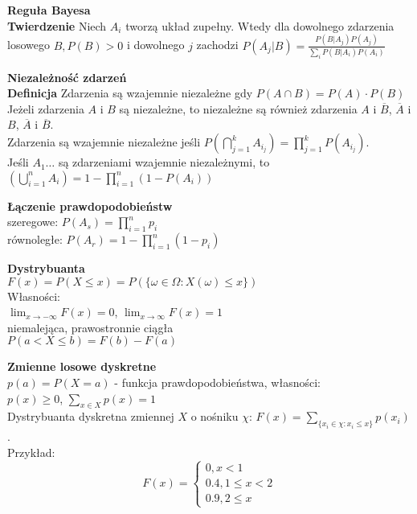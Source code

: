 \documentclass[10pt,landscape,a4paper,notitlepage]{article}
\begin{document}
\begin{multicols*}{4}
        \noindent \textbf{\large Reguła Bayesa}\\
        \textbf{Twierdzenie} Niech $A_i$ tworzą układ zupełny. Wtedy dla dowolnego zdarzenia losowego $B, P(B)>0$ i dowolnego $j$ zachodzi $P(A_j|B)=\frac{P(B|A_j)P(A_j)}{\sum_iP(B|A_i)P(A_i)}$

        \noindent \textbf{\large Niezależność zdarzeń}\\
        \textbf{Definicja} Zdarzenia są wzajemnie niezależne gdy $P(A\cap B)=P(A)\cdot P(B)$\\
        Jeżeli zdarzenia $A$ i $B$ są niezależne, to niezależne są również zdarzenia $A$ i $\overline{B}$, $\overline{A}$ i $B$, $\overline{A}$ i $\overline{B}$.\\
        Zdarzenia są wzajemnie niezależne jeśli $P\left(\bigcap_{j=1}^kA_{i_j}\right) = \prod_{j=1}^kP(A_{i_j})$.\\
        Jeśli $A_1\ldots$ są zdarzeniami wzajemnie niezależnymi, to $\left(\bigcup_{i=1}^nA_i\right)=1-\prod_{i=1}^n(1-P(A_i))$

        \noindent\textbf{\large Łączenie prawdopodobieństw}\\
        szeregowe: $P(A_s)=\prod_{i=1}^np_i$\\
        równoległe: $P(A_r)=1-\prod_{i=1}^n(1-p_i)$

        \noindent\textbf{\large Dystrybuanta}\\
        $F(x)=P(X\leq x) = P(\{\omega\in\Omega : X(\omega)\leq x\})$\\
        Własności:\\
        $\lim_{x\rightarrow-\infty}F(x)=0$, $\lim_{x\rightarrow\infty}F(x)=1$\\
        niemalejąca, prawostronnie ciągła\\
        $P(a<X\leq b)=F(b)-F(a)$

        \noindent\textbf{\large Zmienne losowe dyskretne}\\
        $p(a) = P(X=a)$ - funkcja prawdopodobieństwa, własności:\\
        $p(x)\geq 0$, $\sum_{x\in X}p(x)=1$\\
        Dystrybuanta dyskretna zmiennej $X$ o nośniku $\chi$: $F(x)=\sum_{\{x_i\in \chi:x_i\leq x\}}p(x_i)$.\\
        Przykład:
        \[
            F(x)=
            \begin{cases}
                0, x<1\\
                0.4, 1\leq x<2\\
                0.9, 2\leq x
            \end{cases}
        \]
        

\end{multicols*}
\end{document}
